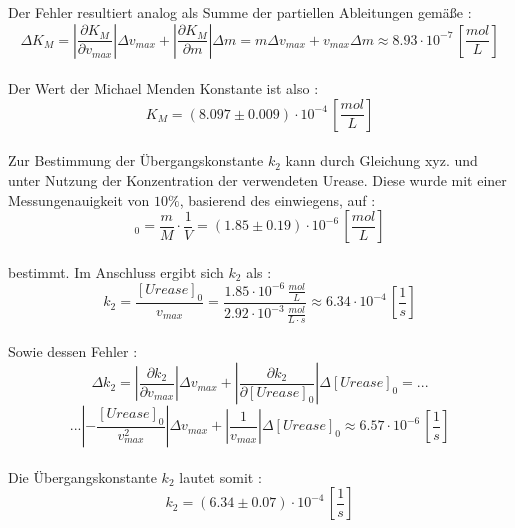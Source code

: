 Der Fehler resultiert analog als Summe der partiellen Ableitungen gemäße : 
\begin{equation}
\Delta K_M = |\frac{\partial K_M}{\partial v_{max}}|\Delta v_{max} + |\frac{\partial K_M}{\partial m}|\Delta m  = m \Delta v_{max} + v_{max}\Delta m \approx 8.93 \cdot 10^{-7} \,[\si{\frac{mol}{L}}]
\end{equation}\\
Der Wert der Michael Menden Konstante ist also : 
\begin{equation}
K_M = (8.097 \pm 0.009) \cdot 10^{-4} \,[\si{\frac{mol}{L}}]
\end{equation}\\
Zur Bestimmung der Übergangskonstante $k_2$ kann durch Gleichung xyz. und unter Nutzung der Konzentration der verwendeten Urease. Diese wurde mit einer Messungenauigkeit von $10\%$, basierend des  einwiegens, auf :
\begin{equation}
[Urease]_0 = \frac{m}{M}\cdot \frac{1}{V} =  (1.85 \pm 0.19)\cdot 10^{-6} \,[\si{\frac{mol}{L}}]
\end{equation} \\
bestimmt. Im Anschluss ergibt sich $k_2$ als : 
\begin{equation}
k_2 = \frac{[Urease]_0}{v_{max}} = \frac{1.85 \cdot 10^{-6} \, \si{\frac{mol}{L}}}{2.92\cdot 10^{-3}\, \si{\frac{mol}{L\cdot s}}} \approx 6.34 \cdot 10^{-4} \, [\si{\frac{1}{s}}]
\end{equation}
\\
Sowie dessen Fehler : 
\begin{equation}
\Delta k_2 = |\frac{\partial k_2}{\partial v_{max}}|\Delta v_{max} + |\frac{\partial k_2}{\partial [Urease]_0}|\Delta [Urease]_0  = ...
\end{equation}
\begin{equation*}
... |-\frac{[Urease]_0}{v_{max}^2}|\Delta v_{max} + |\frac{1}{v_{max}}|\Delta [Urease]_0 \approx 6.57 \cdot 10^{-6} \,[\si{\frac{1}{s}}]
\end{equation*}
\\
Die Übergangskonstante $k_2$ lautet somit : 
\begin{equation}
k_2 = (6.34 \pm 0.07)\cdot 10^{-4}\,[\si{\frac{1}{s}}]
\end{equation}
%